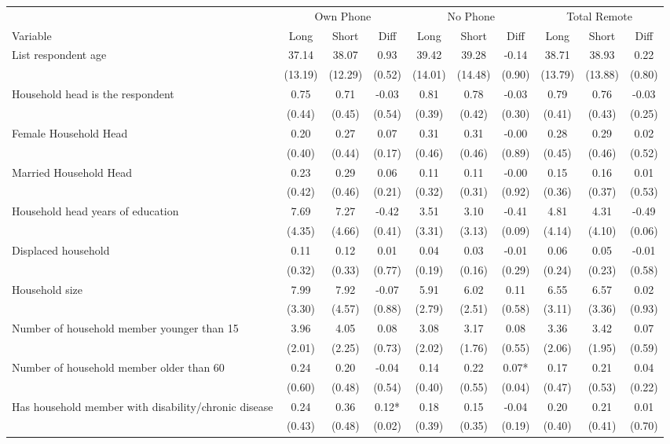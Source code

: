 \begin{tabular}{l*{9}c}
\hline\hline
 & \multicolumn{3}{c}{Own Phone} & \multicolumn{3}{c}{No Phone} & \multicolumn{3}{c}{Total Remote}\\ 
Variable & Long & Short & Diff & Long & Short & Diff & Long & Short & Diff \\
\hline
List respondent age&37.14&38.07&0.93&39.42&39.28&-0.14&38.71&38.93&0.22\\
&(13.19)&(12.29)&(0.52)&(14.01)&(14.48)&(0.90)&(13.79)&(13.88)&(0.80)\\
Household head is the respondent&0.75&0.71&-0.03&0.81&0.78&-0.03&0.79&0.76&-0.03\\
&(0.44)&(0.45)&(0.54)&(0.39)&(0.42)&(0.30)&(0.41)&(0.43)&(0.25)\\
Female Household Head&0.20&0.27&0.07&0.31&0.31&-0.00&0.28&0.29&0.02\\
&(0.40)&(0.44)&(0.17)&(0.46)&(0.46)&(0.89)&(0.45)&(0.46)&(0.52)\\
Married Household Head&0.23&0.29&0.06&0.11&0.11&-0.00&0.15&0.16&0.01\\
&(0.42)&(0.46)&(0.21)&(0.32)&(0.31)&(0.92)&(0.36)&(0.37)&(0.53)\\
Household head years of education&7.69&7.27&-0.42&3.51&3.10&-0.41&4.81&4.31&-0.49\\
&(4.35)&(4.66)&(0.41)&(3.31)&(3.13)&(0.09)&(4.14)&(4.10)&(0.06)\\
Displaced household&0.11&0.12&0.01&0.04&0.03&-0.01&0.06&0.05&-0.01\\
&(0.32)&(0.33)&(0.77)&(0.19)&(0.16)&(0.29)&(0.24)&(0.23)&(0.58)\\
Household size&7.99&7.92&-0.07&5.91&6.02&0.11&6.55&6.57&0.02\\
&(3.30)&(4.57)&(0.88)&(2.79)&(2.51)&(0.58)&(3.11)&(3.36)&(0.93)\\
Number of household member younger than 15&3.96&4.05&0.08&3.08&3.17&0.08&3.36&3.42&0.07\\
&(2.01)&(2.25)&(0.73)&(2.02)&(1.76)&(0.55)&(2.06)&(1.95)&(0.59)\\
Number of household member older than 60&0.24&0.20&-0.04&0.14&0.22&0.07*&0.17&0.21&0.04\\
&(0.60)&(0.48)&(0.54)&(0.40)&(0.55)&(0.04)&(0.47)&(0.53)&(0.22)\\
Has household member with disability/chronic disease&0.24&0.36&0.12*&0.18&0.15&-0.04&0.20&0.21&0.01\\
&(0.43)&(0.48)&(0.02)&(0.39)&(0.35)&(0.19)&(0.40)&(0.41)&(0.70)\\

\end{tabular}
